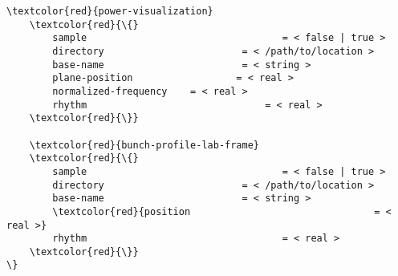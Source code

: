 \begin{multicols}{2}
\begin{Verbatim}[fontsize=\footnotesize, tabsize=2, fontfamily=courier,	fontseries=b, commandchars=\\\{\}]
	\textcolor{red}{power-visualization}
	\textcolor{red}{\{}
		sample  								= < false | true >
		directory  						 = < /path/to/location >
		base-name  						 = < string >
		plane-position  				= < real >
		normalized-frequency  	= < real >
		rhythm		 						 = < real >
	\textcolor{red}{\}}

	\textcolor{red}{bunch-profile-lab-frame}
	\textcolor{red}{\{}
		sample  								= < false | true >
		directory  						 = < /path/to/location >
		base-name  						 = < string >
		\textcolor{red}{position								= < real >}
		rhythm									= < real >
	\textcolor{red}{\}}
\}
\end{Verbatim}
\end{multicols}